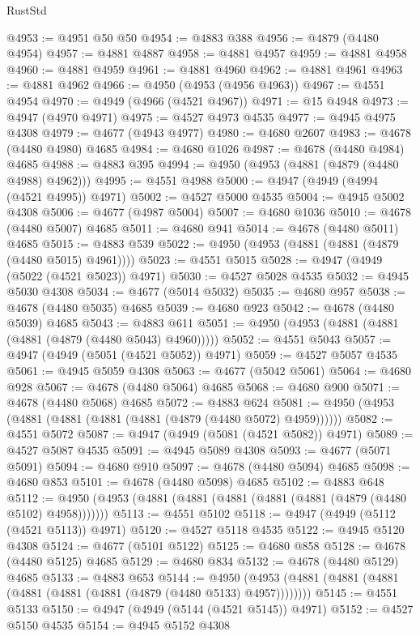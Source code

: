 \begin{lexlean}{RustStd}
\begin{coremodule}
@4953 := @4951 @50 @50
@4954 := @4883 @388
@4956 := @4879 (@4480 @4954)
@4957 := @4881 @4887
@4958 := @4881 @4957
@4959 := @4881 @4958
@4960 := @4881 @4959
@4961 := @4881 @4960
@4962 := @4881 @4961
@4963 := @4881 @4962
@4966 := @4950 (@4953 (@4956 @4963))
@4967 := @4551 @4954
@4970 := @4949 (@4966 (@4521 @4967))
@4971 := @15 @4948
@4973 := @4947 (@4970 @4971)
@4975 := @4527 @4973 @4535
@4977 := @4945 @4975 @4308
@4979 := @4677 (@4943 @4977)
@4980 := @4680 @2607
@4983 := @4678 (@4480 @4980) @4685
@4984 := @4680 @1026
@4987 := @4678 (@4480 @4984) @4685
@4988 := @4883 @395
@4994 := @4950 (@4953 (@4881 (@4879 (@4480 @4988) @4962)))
@4995 := @4551 @4988
@5000 := @4947 (@4949 (@4994 (@4521 @4995)) @4971)
@5002 := @4527 @5000 @4535
@5004 := @4945 @5002 @4308
@5006 := @4677 (@4987 @5004)
@5007 := @4680 @1036
@5010 := @4678 (@4480 @5007) @4685
@5011 := @4680 @941
@5014 := @4678 (@4480 @5011) @4685
@5015 := @4883 @539
@5022 := @4950 (@4953 (@4881 (@4881 (@4879 (@4480 @5015) @4961))))
@5023 := @4551 @5015
@5028 := @4947 (@4949 (@5022 (@4521 @5023)) @4971)
@5030 := @4527 @5028 @4535
@5032 := @4945 @5030 @4308
@5034 := @4677 (@5014 @5032)
@5035 := @4680 @957
@5038 := @4678 (@4480 @5035) @4685
@5039 := @4680 @923
@5042 := @4678 (@4480 @5039) @4685
@5043 := @4883 @611
@5051 := @4950 (@4953 (@4881 (@4881 (@4881 (@4879 (@4480 @5043) @4960)))))
@5052 := @4551 @5043
@5057 := @4947 (@4949 (@5051 (@4521 @5052)) @4971)
@5059 := @4527 @5057 @4535
@5061 := @4945 @5059 @4308
@5063 := @4677 (@5042 @5061)
@5064 := @4680 @928
@5067 := @4678 (@4480 @5064) @4685
@5068 := @4680 @900
@5071 := @4678 (@4480 @5068) @4685
@5072 := @4883 @624
@5081 := @4950 (@4953 (@4881 (@4881 (@4881 (@4881 (@4879 (@4480 @5072) @4959))))))
@5082 := @4551 @5072
@5087 := @4947 (@4949 (@5081 (@4521 @5082)) @4971)
@5089 := @4527 @5087 @4535
@5091 := @4945 @5089 @4308
@5093 := @4677 (@5071 @5091)
@5094 := @4680 @910
@5097 := @4678 (@4480 @5094) @4685
@5098 := @4680 @853
@5101 := @4678 (@4480 @5098) @4685
@5102 := @4883 @648
@5112 := @4950 (@4953 (@4881 (@4881 (@4881 (@4881 (@4881 (@4879 (@4480 @5102) @4958)))))))
@5113 := @4551 @5102
@5118 := @4947 (@4949 (@5112 (@4521 @5113)) @4971)
@5120 := @4527 @5118 @4535
@5122 := @4945 @5120 @4308
@5124 := @4677 (@5101 @5122)
@5125 := @4680 @858
@5128 := @4678 (@4480 @5125) @4685
@5129 := @4680 @834
@5132 := @4678 (@4480 @5129) @4685
@5133 := @4883 @653
@5144 := @4950 (@4953 (@4881 (@4881 (@4881 (@4881 (@4881 (@4881 (@4879 (@4480 @5133) @4957))))))))
@5145 := @4551 @5133
@5150 := @4947 (@4949 (@5144 (@4521 @5145)) @4971)
@5152 := @4527 @5150 @4535
@5154 := @4945 @5152 @4308

\end{coremodule}
\end{lexlean}
